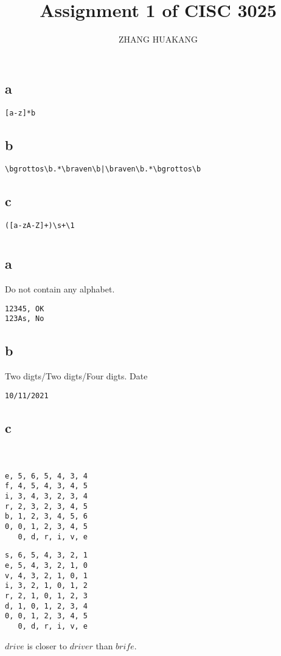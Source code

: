 \documentclass{article}
\title{Assignment 1 of CISC 3025}
\author{ZHANG HUAKANG}
\begin{document}
    \maketitle
    \section{}
    \subsection*{a}
    \begin{verbatim}
[a-z]*b
    \end{verbatim}
    \subsection*{b}
    \begin{verbatim}
\bgrottos\b.*\braven\b|\braven\b.*\bgrottos\b
    \end{verbatim}
    \subsection*{c}
    \begin{verbatim}
([a-zA-Z]+)\s+\1
    \end{verbatim}
    \section{}
    \subsection*{a}
    Do not contain any alphabet.
    \begin{verbatim}
12345, OK
123As, No
    \end{verbatim}
    \subsection*{b}
    Two digts/Two digts/Four digts.
    Date
    \begin{verbatim}
10/11/2021
    \end{verbatim}
    \subsection*{c}
    \begin{verbatim}

    \end{verbatim}
    \section{}
    \begin{verbatim}
e, 5, 6, 5, 4, 3, 4 
f, 4, 5, 4, 3, 4, 5
i, 3, 4, 3, 2, 3, 4
r, 2, 3, 2, 3, 4, 5
b, 1, 2, 3, 4, 5, 6   
0, 0, 1, 2, 3, 4, 5
   0, d, r, i, v, e  
    \end{verbatim}
    \begin{verbatim}
s, 6, 5, 4, 3, 2, 1
e, 5, 4, 3, 2, 1, 0
v, 4, 3, 2, 1, 0, 1
i, 3, 2, 1, 0, 1, 2
r, 2, 1, 0, 1, 2, 3
d, 1, 0, 1, 2, 3, 4
0, 0, 1, 2, 3, 4, 5
   0, d, r, i, v, e
    \end{verbatim}
    $drive$ is closer to $driver$ than $brife$. 
\end{document}
